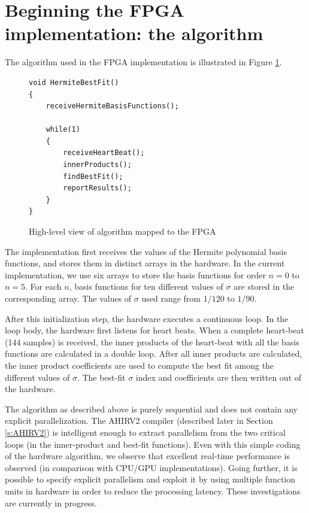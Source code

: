 \documentclass[conference]{IEEEtran}
\begin{document}
\section{Beginning the FPGA implementation: the algorithm} \label{s:algorithm}

The algorithm used in the FPGA implementation is illustrated in 
Figure \ref{fig:FpgaAlgo}.
\begin{figure}
\begin{centering}
\small\begin{verbatim}
void HermiteBestFit()
{  
    receiveHermiteBasisFunctions();

    while(1)
    {
        receiveHeartBeat();
        innerProducts();
        findBestFit();
        reportResults();
    }
}
\end{verbatim}
\normalsize
\end{centering}
\caption{High-level view of algorithm mapped to the FPGA}
\label{fig:FpgaAlgo}
\end{figure}

The implementation first receives the values of the Hermite polynomial basis
functions, and  stores them in distinct arrays in the hardware.  In the
current implementation, we use six
arrays to store the basis functions for order $n=0$ to $n=5$.  For each
$n$, basis functions for ten different values of $\sigma$ are stored in the corresponding
array.  The values of $\sigma$ used range from $1/120$ to $1/90$.

After this initialization step, the hardware executes a continuous loop.  
In the loop body, the hardware first listens for heart beats. When
a complete heart-beat (144 samples) is received, the inner products of the
heart-beat with all the basis functions are calculated in a double loop.  
After all inner products are calculated, the inner product coefficients
are used to compute the best fit among the different values of $\sigma$.
The best-fit $\sigma$ index and coefficients
are then written out of the hardware. 

The algorithm as described above is purely sequential
and does not contain any explicit parallelization.  The AHIRV2 compiler
(described later in Section \ref{s:AHIRV2}) is intelligent enough to extract 
parallelism from the two critical loops (in the inner-product and best-fit functions).
Even with this simple coding of the hardware algorithm,
we observe that excellent real-time performance
is observed (in comparison with CPU/GPU implementations).
Going further, it is possible to specify explicit parallelism %
and exploit it by using multiple function units in hardware
in order to reduce the processing latency.  These investigations
are currently in progress.
\end{document}
